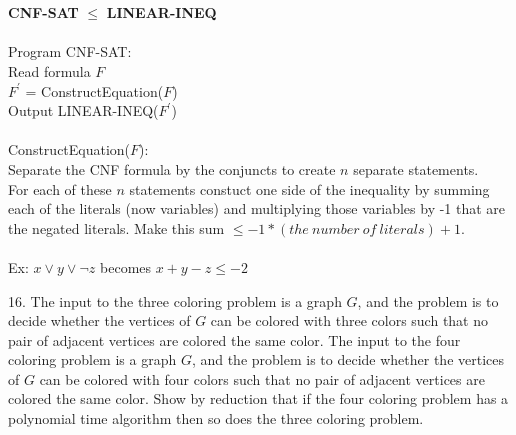 \documentclass[10pt]{article}
\newcommand{\tab}{\hspace*{2em}}
\begin{document}
	\\
	\\
	\textbf{CNF-SAT} $\leq$ \textbf{LINEAR-INEQ}\\
	\\
	Program CNF-SAT:\\
	\tab Read formula $F$\\
	\tab $F^\prime$ = ConstructEquation($F$)\\ 
	\tab Output	LINEAR-INEQ($F^\prime$)\\
	\\
	ConstructEquation($F$):\\
	Separate the CNF formula by the conjuncts to create $n$ separate statements.\\
	For each of these $n$ statements constuct one side of the inequality by 
	summing each of the literals (now variables) and multiplying those variables by
	-1 that are the negated literals. Make this sum $\leq -1*(the~number~of~literals) + 1$.\\
	\\
	Ex: $x \vee y \vee \neg z$ becomes $x + y -z \leq -2$
		
	16.  The input to the three coloring problem is a graph $G$, and the problem is to decide whether the vertices
of $G$ can be colored with three colors such that no pair of adjacent vertices are colored the same color.
The input to the four coloring problem is a graph $G$, and the problem is to decide whether the vertices
of $G$ can be colored with four colors such that no pair of adjacent vertices are colored the same color.
Show by reduction that if the four coloring problem has a polynomial time algorithm then so does the
three coloring problem. 
\end{document}
